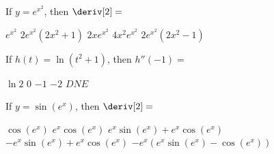 \begin{questions}
    \question If $y = e^{x^2}$, then $\deriv[2] = $ \\

    \begin{oneparchoices}
        \choice $e^{x^2}$
        \choice $2e^{x^2}\left(2x^2 + 1\right)$
        \choice $2xe^{x^2}$
        \choice $4x^2e^{x^2}$
        \choice $2e^{x^2}\left(2x^2 - 1\right)$
    \end{oneparchoices} \par \horizontalline

    \question If $h(t) = \ln \left(t^2 + 1\right)$, then $h''(-1) = $ \\

    \begin{oneparchoices}
        \choice $\ln 2$
        \choice $0$
        \choice $-1$
        \choice $-2$
        \choice $DNE$
    \end{oneparchoices} \par \horizontalline

    \question If $y = \sin \left(e^x\right)$, then $\deriv[2] = $ \\

    \begin{oneparchoices}
        \choice $\cos \left(e^x\right)$
        \choice $e^x \cos \left(e^x\right)$
        \choice $e^x\sin \left(e^x\right) + e^x\cos \left(e^x\right)$ \\[11pt]
        \makebox[0.12\textwidth] \choice $-e^x\sin \left(e^x\right) + e^x\cos \left(e^x\right)$
        \makebox[0.20\textwidth]\choice $-e^x\left(e^x\sin \left(e^x\right) - \cos \left(e^x\right)\right)$
    \end{oneparchoices} \par \horizontalline
\end{questions}